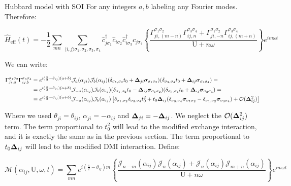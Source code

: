 \begin{section}{Hubbard model with SOI}
For any integers $a,b$ labeling any Fourier modes. Therefore:

\begin{equation}
\hat{H}_{\text{eff}}(t) = -\frac{1}{2}\sum_{mn} \sum_{\langle i,j \rangle \sigma_1, \sigma_2, \sigma_3, \sigma_4} \hat{c}_{j\sigma_1}^\dagger\hat{c}_{i\sigma_2}\hat{c}_{i\sigma_3}^\dagger\hat{c}_{j\sigma_4} \left\{ \frac{\Gamma_{ji,(m-n)}^{\sigma_1\sigma_2}\Gamma_{ij,n}^{\sigma_3\sigma_4} + \Gamma_{ji,-n}^{\sigma_1\sigma_2}\Gamma_{ij,(m+n)}^{\sigma_3\sigma_4} }{\text{U}+n\omega}  \right\} e^{im\omega t}
\end{equation}

We can write:

\begin{align*}
\Gamma_{ji,a}^{\sigma_1\sigma_2}\Gamma_{ij,b}^{\sigma_3\sigma_4} &= e^{i(\frac{\pi}{2}-\theta_{ij})(a+b)}\mathcal{J}_{a}(\alpha_{ji})\mathcal{J}_b(\alpha_{ij})(\delta_{\sigma_1, \sigma_2}t_0+\boldsymbol{\Delta}_{ji}\boldsymbol{\sigma}_{\sigma_1 \sigma_2})(\delta_{\sigma_3, \sigma_4}t_0+\boldsymbol{\Delta}_{ij}\boldsymbol{\sigma}_{\sigma_3 \sigma_4}) = \\
&= e^{i(\frac{\pi}{2}-\theta_{ij})(a+b)}\mathcal{J}_{-a}(\alpha_{ij})\mathcal{J}_{b}(\alpha_{ij})(\delta_{\sigma_1, \sigma_2}t_0-\boldsymbol{\Delta}_{ij}\boldsymbol{\sigma}_{\sigma_1 \sigma_2})(\delta_{\sigma_3, \sigma_4}t_0+\boldsymbol{\Delta}_{ij}\boldsymbol{\sigma}_{\sigma_3 \sigma_4}) = \\
&= e^{i(\frac{\pi}{2}-\theta_{ij})(a+b)}\mathcal{J}_{-a}(\alpha_{ij})\mathcal{J}_{b}(\alpha_{ij}) \left[ \delta_{\sigma_1, \sigma_2}\delta_{\sigma_3, \sigma_4}t_0^2+t_0\boldsymbol{\Delta}_{ij}(\delta_{\sigma_3,\sigma_4}\boldsymbol{\sigma}_{\sigma_1 \sigma_2}-\delta_{\sigma_1,\sigma_2}\boldsymbol{\sigma}_{\sigma_3 \sigma_4}) + \mathcal{O}(\boldsymbol{\Delta}_{ij}^2) \right]
\end{align*}

Where we used $\theta_{ji} = \theta_{ij}$, $\alpha_{ji} = - \alpha_{ij}$ and $\boldsymbol{\Delta}_{ji} = -\boldsymbol{\Delta}_{ij}$. We neglect the $\mathcal{O}(\boldsymbol{\Delta}_{ij}^2)$ term. The term proportional to $t_0^2$ will lead to the modified exchange interaction, and it is exactly the same as in the previous section. The term proportional to $t_0\boldsymbol{\Delta}_{ij}$ will lead to the modified DMI interaction. Define:

\begin{equation}
\mathcal{M}(\alpha_{ij}, \text{U}, \omega, t) = \sum_{mn}e^{i(\frac{\pi}{2}-\theta_{ij})m} \left\{ 
    \frac{\mathcal{J}_{n-m}(\alpha_{ij})\mathcal{J}_{n}(\alpha_{ij}) + \mathcal{J}_{n}(\alpha_{ij})\mathcal{J}_{m+n}(\alpha_{ij})}{\text{U}+n\omega} \right\}e^{im\omega t}
\end{equation}


\end{section}
